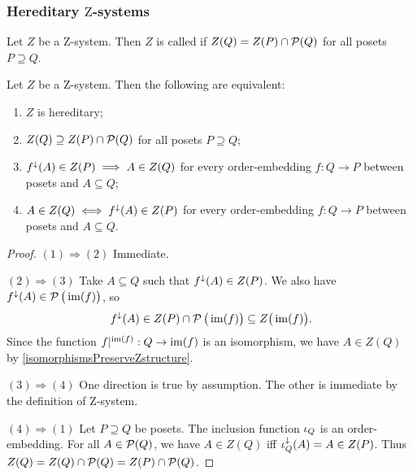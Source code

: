 \subsubsection{Hereditary $\mathrm{Z}$-systems}
\begin{definition}
Let $Z$ be a $\mathrm{Z}$-system. Then $Z$ is called  if $Z(Q) = Z(P)\cap \operatorname{\mathcal{P}}(Q)$ for all posets $P \supseteq Q$.
\end{definition}

\begin{lemma}
Let $Z$ be a $\mathrm{Z}$-system. Then the following are equivalent:
\begin{enumerate}
\item $Z$ is hereditary;
\item $Z(Q) \supseteq Z(P)\cap \operatorname{\mathcal{P}}(Q)$ for all posets $P \supseteq Q$;
\item $f^\downarrow(A) \in Z(P) \implies A \in Z(Q)$ for every order-embedding $f: Q\to P$ between posets and $A\subseteq Q$;
\item $A \in Z(Q) \iff f^\downarrow(A) \in Z(P)$ for every order-embedding $f: Q\to P$ between posets and $A\subseteq Q$.
\end{enumerate}
\end{lemma}
\begin{proof}
$(1) \Rightarrow (2)$ Immediate.

$(2) \Rightarrow (3)$ Take $A\subseteq Q$ such that $f^\downarrow(A) \in Z(P)$. We also have $f^\downarrow(A) \in \operatorname{\mathcal{P}}\big(\operatorname{im}(f)\big)$, so
\[ f^\downarrow(A) \in Z(P) \cap \operatorname{\mathcal{P}}\big(\operatorname{im}(f)\big) \subseteq Z\big(\operatorname{im}(f)\big). \]
Since the function $f|^{\operatorname{im}(f)}: Q \to \operatorname{im}(f)$ is an isomorphism, we have $A\in Z(Q)$ by \ref{isomorphismsPreserveZstructure}.

$(3) \Rightarrow (4)$ One direction is true by assumption. The other is immediate by the definition of $\mathrm{Z}$-system.

$(4) \Rightarrow (1)$ Let $P\supseteq Q$ be posets. The inclusion function $\operatorname{\iota}_Q$ is an order-embedding. For all $A\in \operatorname{\mathcal{P}}(Q)$, we have $A\in Z(Q)$ iff $\operatorname{\iota}_Q^\downarrow(A) = A \in Z(P)$. Thus $Z(Q) = Z(Q) \cap \operatorname{\mathcal{P}}(Q) = Z(P) \cap \operatorname{\mathcal{P}}(Q)$.
\end{proof}


